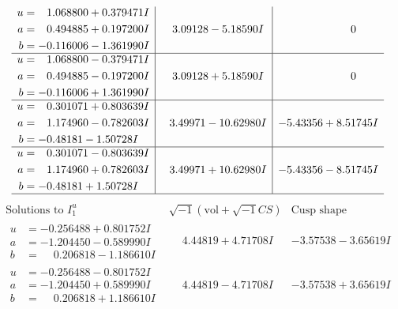 \documentclass[1p]{elsarticle_modified}
\theoremstyle{definition}
\newcommand{\I}{\sqrt{-1}}
\begin{document}
$$\begin{array}{c|c|c}
\begin{aligned}
u &= \phantom{-}1.068800 + 0.379471 I \\
a &= \phantom{-}0.494885 + 0.197200 I \\
b &= -0.116006 - 1.361990 I\end{aligned}
 & \phantom{-}3.09128 - 5.18590 I & \phantom{-0.000000 } 0 \\ \hline\begin{aligned}
u &= \phantom{-}1.068800 - 0.379471 I \\
a &= \phantom{-}0.494885 - 0.197200 I \\
b &= -0.116006 + 1.361990 I\end{aligned}
 & \phantom{-}3.09128 + 5.18590 I & \phantom{-0.000000 } 0 \\ \hline\begin{aligned}
u &= \phantom{-}0.301071 + 0.803639 I \\
a &= \phantom{-}1.174960 - 0.782603 I \\
b &= -0.48181 - 1.50728 I\end{aligned}
 & \phantom{-}3.49971 - 10.62980 I & -5.43356 + 8.51745 I \\ \hline\begin{aligned}
u &= \phantom{-}0.301071 - 0.803639 I \\
a &= \phantom{-}1.174960 + 0.782603 I \\
b &= -0.48181 + 1.50728 I\end{aligned}
 & \phantom{-}3.49971 + 10.62980 I & -5.43356 - 8.51745 I\\
 \hline 
 \end{array}$$\newpage$$\begin{array}{c|c|c}  
\text{Solutions to }I^u_{1}& \I (\text{vol} + \sqrt{-1}CS) & \text{Cusp shape}\\
 \hline 
\begin{aligned}
u &= -0.256488 + 0.801752 I \\
a &= -1.204450 - 0.589990 I \\
b &= \phantom{-}0.206818 - 1.186610 I\end{aligned}
 & \phantom{-}4.44819 + 4.71708 I & -3.57538 - 3.65619 I \\ \hline\begin{aligned}
u &= -0.256488 - 0.801752 I \\
a &= -1.204450 + 0.589990 I \\
b &= \phantom{-}0.206818 + 1.186610 I\end{aligned}
 & \phantom{-}4.44819 - 4.71708 I & -3.57538 + 3.65619 I \\ \hline\begin{aligned}

\end{aligned}
\end{array}$$
\end{document}
